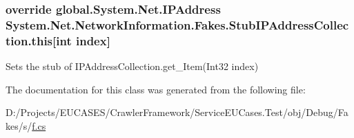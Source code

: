 \hypertarget{class_system_1_1_net_1_1_network_information_1_1_fakes_1_1_stub_i_p_address_collection_aac4abf2cc4b514eccf02685b43a7a7aa}{
\subsubsection[{this[int index]}]{\setlength{\rightskip}{0pt plus 5cm}override global.\-System.\-Net.\-I\-P\-Address System.\-Net.\-Network\-Information.\-Fakes.\-Stub\-I\-P\-Address\-Collection.\-this\mbox{[}int {\bf index}\mbox{]}\hspace{0.3cm}{\ttfamily [get]}}}\label{class_system_1_1_net_1_1_network_information_1_1_fakes_1_1_stub_i_p_address_collection_aac4abf2cc4b514eccf02685b43a7a7aa}


Sets the stub of I\-P\-Address\-Collection.\-get\-\_\-\-Item(\-Int32 index)



The documentation for this class was generated from the following file\-:\begin{DoxyCompactItemize}
\item 
D\-:/\-Projects/\-E\-U\-C\-A\-S\-E\-S/\-Crawler\-Framework/\-Service\-E\-U\-Cases.\-Test/obj/\-Debug/\-Fakes/s/\hyperlink{s_2f_8cs}{f.\-cs}\end{DoxyCompactItemize}
